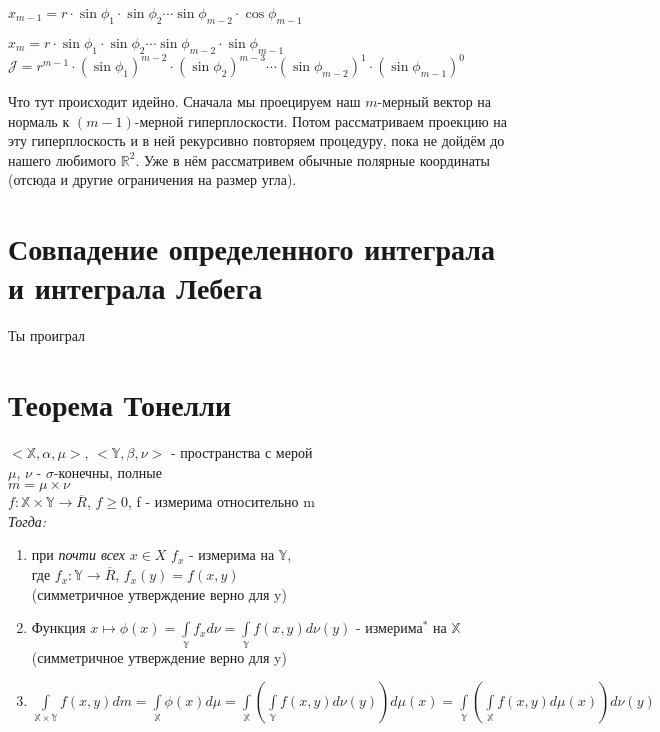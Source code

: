 \documentclass[paper=a4, fontsize=14pt]{report}
\begin{document}
$x_{m-1} = r \cdot \sin \phi_1 \cdot \sin \phi_2 \cdots \sin \phi_{m-2} \cdot \cos \phi_{m-1}$

$x_{m} = r \cdot \sin \phi_1 \cdot \sin \phi_2 \cdots \sin \phi_{m-2} \cdot \sin \phi_{m-1}$\\

$\mathcal{J} = r^{m-1} \cdot (\sin \phi_1)^{m-2} \cdot (\sin \phi_2)^{m-3} \cdots (\sin \phi_{m-2})^{1} \cdot (\sin \phi_{m-1})^{0}$

Что тут происходит идейно. Сначала мы проецируем наш $m$-мерный вектор на нормаль к $(m-1)$-мерной гиперплоскости. Потом рассматриваем проекцию на эту гиперплоскость и в ней рекурсивно повторяем процедуру, пока не дойдём до нашего любимого $\mathds{R}^2$. Уже в нём рассматривем обычные полярные координаты (отсюда и другие ограничения на размер угла).

\section{Совпадение определенного интеграла и интеграла Лебега}

Ты проиграл

\section{Теорема Тонелли}
$<\mathds{X}, \alpha, \mu>$, $<\mathds{Y}, \beta, \nu>$ - пространства с мерой\\
$\mu$, $\nu$ - $\sigma$-конечны, полные \\
$m = \mu \times \nu$ \\
$f: \mathds{X} \times \mathds{Y} \rightarrow \overline{R}$, $f \geq 0$, f - измерима относительно m \\
\emph{Тогда:}
\begin{enumerate}
	\item при \textit{почти всех} $x \in X$ $f_x$ - измерима на $\mathds{Y}$, \\
	 где $f_x : \mathds{Y} \rightarrow \overline{R}$, $f_x(y) = f(x, y)$ \\
	 (симметричное утверждение верно для y)
	 \item Функция $x \mapsto \phi(x) = \int\limits_{\mathds{Y}}f_x d\nu = \int\limits_{\mathds{Y}}f(x, y) d\nu(y) $ - $\text{измерима}^{\text{*}}$ на $\mathds{X}$ \\
	 (симметричное утверждение верно для y)
	 \item $\int\limits_{\mathds{X} \times \mathds{Y}}f(x, y)dm = \int\limits_{\mathds{X}}\phi(x)d\mu = \int\limits_{\mathds{X}}(\int\limits_{\mathds{Y}} f(x, y)d\nu(y))d\mu(x) = \int\limits_{\mathds{Y}}(\int\limits_{\mathds{X}}f(x,y)d\mu(x))d\nu(y)$
\end{enumerate}
\end{document}
